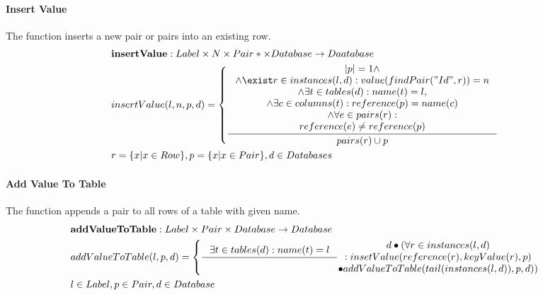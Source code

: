 \documentclass[11pt]{article}
\begin{document}
\paragraph{Insert Value} The function inserts a new pair or pairs into an existing row.
\begin{align*}
&	\mathbf{insertValue} : Label \times N \times Pair* \times Database \rightarrow Daatabase \\
&	insertValue(l, n, p, d) = \begin{cases}
 		\inference{|p| = 1 \wedge 
 		\\ \wedge \exist r \in instances(l, d) : value(findPair("Id", r)) = n
 		\\ \wedge \exists t \in tables(d) : name(t) = l, 
 		\\ \wedge \exists c \in columns(t) : reference(p) = name(c) 
 		\\ \wedge \forall e \in pairs(r) :\\  reference(e) \neq reference(p) }{pairs(r) \cup p} 
 		\end{cases} \\
& r = \{ x | x \in Row\}, p = \{ x | x \in Pair\},d \in Databases
\end{align*}

\paragraph{Add Value To Table} The function appends a pair to all rows of a table with given name.
\begin{align*}
&	\mathbf{addValueToTable} : Label \times Pair \times Database \rightarrow Database \\
&	addValueToTable(l, p, d) = \begin{cases}
 		\inference{\exists t \in tables(d) : name(t) = l}	{\begin{gathered}
		d \bullet (\forall r \in instances(l, d) \\ : insetValue(reference(r), keyValue(r), p) \\ \bullet addValueToTable(tail(instances(l, d)), p, d))
	\end{gathered}} 
 	\end{cases}\\ 
& 	l \in Label, p \in Pair,  d \in Database
\end{align*}
\end{document}

